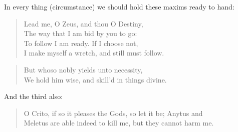 In every thing (circumstance) we should hold these maxims ready to hand:

\begin{quote}
  Lead me, O Zeus, and thou O Destiny,\\
  The way that I am bid by you to go:\\
  To follow I am ready. If I choose not,\\
  I make myself a wretch, and still must follow.
\end{quote}

\begin{quote}
  But whoso nobly yields unto necessity,\\
  We hold him wise, and skill'd in things divine.
\end{quote}

And the third also: 

\begin{quote}
  O Crito, if so it pleases the Gods, so let it be; Anytus and \\
  Meletus are able indeed to kill me, but they cannot harm me.
\end{quote}

